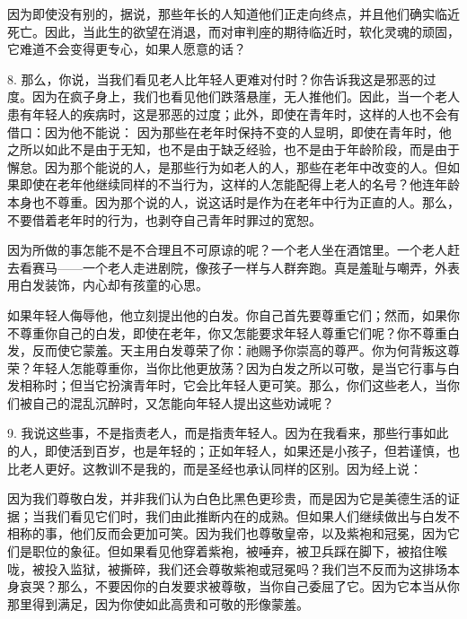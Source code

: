 因为即使没有别的，据说，那些年长的人知道他们正走向终点，并且他们确实临近死亡。因此，当此生的欲望在消退，而对审判座的期待临近时，软化灵魂的顽固，它难道不会变得更专心，如果人愿意的话？\par

8. 那么，你说，当我们看见老人比年轻人更难对付时？你告诉我这是邪恶的过度。因为在疯子身上，我们也看见他们跌落悬崖，无人推他们。因此，当一个老人患有年轻人的疾病时，这是邪恶的过度；此外，即使在青年时，这样的人也不会有借口：因为他不能说：  因为那些在老年时保持不变的人显明，即使在青年时，他之所以如此不是由于无知，也不是由于缺乏经验，也不是由于年龄阶段，而是由于懈怠。因为那个能说的人，是那些行为如老人的人，那些在老年中改变的人。但如果即使在老年他继续同样的不当行为，这样的人怎能配得上老人的名号？他连年龄本身也不尊重。因为那个说的人，说这话时是作为在老年中行为正直的人。那么，不要借着老年时的行为，也剥夺自己青年时罪过的宽恕。\par

因为所做的事怎能不是不合理且不可原谅的呢？一个老人坐在酒馆里。一个老人赶去看赛马——一个老人走进剧院，像孩子一样与人群奔跑。真是羞耻与嘲弄，外表用白发装饰，内心却有孩童的心思。\par

如果年轻人侮辱他，他立刻提出他的白发。你自己首先要尊重它们；然而，如果你不尊重你自己的白发，即使在老年，你又怎能要求年轻人尊重它们呢？你不尊重白发，反而使它蒙羞。天主用白发尊荣了你：祂赐予你崇高的尊严。你为何背叛这尊荣？年轻人怎能尊重你，当你比他更放荡？因为白发之所以可敬，是当它行事与白发相称时；但当它扮演青年时，它会比年轻人更可笑。那么，你们这些老人，当你们被自己的混乱沉醉时，又怎能向年轻人提出这些劝诫呢？\par

9. 我说这些事，不是指责老人，而是指责年轻人。因为在我看来，那些行事如此的人，即使活到百岁，也是年轻的；正如年轻人，如果还是小孩子，但若谨慎，也比老人更好。这教训不是我的，而是圣经也承认同样的区别。因为经上说： \par

因为我们尊敬白发，并非我们认为白色比黑色更珍贵，而是因为它是美德生活的证据；当我们看见它们时，我们由此推断内在的成熟。但如果人们继续做出与白发不相称的事，他们反而会更加可笑。因为我们也尊敬皇帝，以及紫袍和冠冕，因为它们是职位的象征。但如果看见他穿着紫袍，被唾弃，被卫兵踩在脚下，被掐住喉咙，被投入监狱，被撕碎，我们还会尊敬紫袍或冠冕吗？我们岂不反而为这排场本身哀哭？那么，不要因你的白发要求被尊敬，当你自己委屈了它。因为它本当从你那里得到满足，因为你使如此高贵和可敬的形像蒙羞。\par

